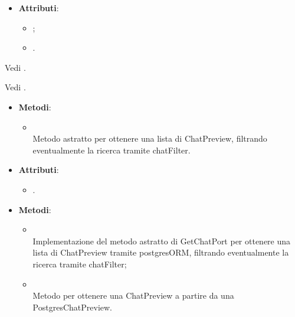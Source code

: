 \documentclass[10pt, a4paper]{article}
\begin{document}
\label{ChatPreviewDettaglio}
\begin{itemize}
    \item \textbf{Attributi}:
    \begin{itemize}
        \item {};
        \item {}.
    \end{itemize}
\end{itemize}

Vedi .

Vedi .

\label{GetChatsPortDettaglio}
\begin{itemize}
    \item \textbf{Metodi}:
    \begin{itemize}
        \item {}\\
        Metodo astratto per ottenere una lista di ChatPreview, filtrando eventualmente la ricerca tramite chatFilter.
    \end{itemize}
\end{itemize}

\label{GetChatsPostgresDettaglio}
\begin{itemize}
    \item \textbf{Attributi}:
    \begin{itemize}
        \item {}.
    \end{itemize}
    \item \textbf{Metodi}:
    \begin{itemize}
        \item {}\\
        Implementazione del metodo astratto di GetChatPort per ottenere una lista di ChatPreview tramite postgresORM, filtrando eventualmente la ricerca tramite chatFilter;
        \item {}\\ 
        Metodo per ottenere una ChatPreview a partire da una PostgresChatPreview.
    \end{itemize}
\end{itemize}
\end{document}
